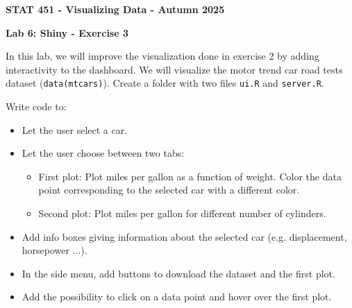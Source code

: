 \documentclass[letterpaper, 12pt]{article}
\begin{document}
\begin{center}
\textbf{\Large{STAT 451 - Visualizing Data - Autumn 2025}}
\end{center}

\vspace{2em}

\textbf{\large{Lab 6: Shiny - Exercise 3}}

\vspace{2em}

In this lab, we will improve the visualization done in exercise 2 by adding interactivity to the dashboard. We will visualize the motor trend car road tests dataset (\verb|data(mtcars)|). Create a folder with two files \verb|ui.R| and \verb|server.R|.

\vspace{1em}

Write code to:
\begin{itemize}
	\item Let the user select a car.
	\item Let the user choose between two tabs:
	\begin{itemize}
		\item First plot: Plot miles per gallon as a function of weight. Color the data point corresponding to the selected car with a different color.
		\item Second plot: Plot miles per gallon for different number of cylinders.
	\end{itemize}
	\item Add info boxes giving information about the selected car (e.g. displacement, horsepower ...).
	\item In the side menu, add buttons to download the dataset and the first plot.
	\item Add the possibility to click on a data point and hover over the first plot.
\end{itemize}

\vspace{1em}
 
\end{document}

